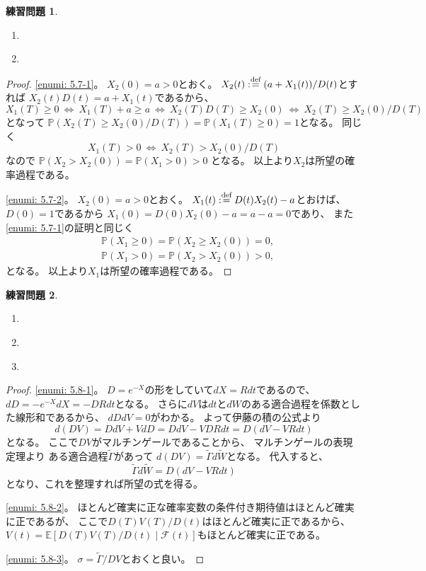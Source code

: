 \documentclass[uplatex]{jsarticle}
\theoremstyle{definition}
\newtheorem{prob}[prob]{練習問題}
\def\P{\mathbb{P}}
\def\E{\mathbb{E}}
\def\mcF{\mathcal{F}}
\def\dfn{:\overset{\mbox{{\scriptsize def}}}{=}}
\begin{document}
\begin{prob}\label{prob: 5.7}
  \begin{enumerate}
    \item \label{enumi: 5.7-1}
    \item \label{enumi: 5.7-2}
  \end{enumerate}
\end{prob}

\begin{proof}
  \ref{enumi: 5.7-1}。
  \(X_2(0) = a > 0\)とおく。
  \(X_2(t) \dfn (a+X_1(t))/D(t)\)とすれば
  \(X_2(t)D(t) = a+X_1(t)\)であるから、
  \[
  X_1(T) \geq 0 \ \iff \ X_1(T)+a \geq a \ \iff \ X_2(T)D(T) \geq X_2(0)
  \ \iff \ X_2(T) \geq X_2(0)/D(T)
  \]
  となって
  \(\P(X_2(T) \geq X_2(0) / D(T)) = \P(X_1(T) \geq 0) = 1\)となる。
  同じく
  \[
  X_1(T) > 0 \ \iff \ X_2(T) > X_2(0)/D(T)
  \]
  なので
  \(\P(X_2 > X_2(0)) = \P(X_1 > 0) > 0\)
  となる。
  以上より\(X_2\)は所望の確率過程である。

  \ref{enumi: 5.7-2}。
  \(X_2(0) = a > 0\)とおく。
  \(X_1(t) \dfn D(t)X_2(t) - a\)とおけば、
  \(D(0)=1\)であるから
  \(X_1(0) = D(0)X_2(0) - a = a-a = 0\)であり、
  また\ref{enumi: 5.7-1}の証明と同じく
  \begin{align*}
    &\P(X_1 \geq 0) = \P(X_2 \geq X_2(0)) = 0, \\
    &\P(X_1 > 0) = \P(X_2 > X_2(0)) > 0,
  \end{align*}
  となる。
  以上より\(X_1\)は所望の確率過程である。
\end{proof}






\begin{prob}\label{prob: 5.8}
  \begin{enumerate}
    \item \label{enumi: 5.8-1}
    \item \label{enumi: 5.8-2}
    \item \label{enumi: 5.8-3}
  \end{enumerate}
\end{prob}

\begin{proof}
  \ref{enumi: 5.8-1}。
  \(D=e^{-X}\)の形をしていて\(dX=Rdt\)であるので、
  \(dD = -e^{-X}dX = -DRdt\)となる。
  さらに\(dV\)は\(dt\)と\(dW\)のある適合過程を係数とした線形和であるから、
  \(dDdV = 0\)がわかる。
  よって伊藤の積の公式より
  \[
  d(DV) = DdV + VdD = DdV - VDRdt = D(dV-VRdt)
  \]
  となる。
  ここで\(DV\)がマルチンゲールであることから、
  マルチンゲールの表現定理より
  ある適合過程\(\tilde{\Gamma}\)があって
  \(d(DV) = \tilde{\Gamma}d\tilde{W}\)となる。
  代入すると、
  \[
  \tilde{\Gamma}d\tilde{W} = D(dV-VRdt)
  \]
  となり、これを整理すれば所望の式を得る。

  \ref{enumi: 5.8-2}。
  ほとんど確実に正な確率変数の条件付き期待値はほとんど確実に正であるが、
  ここで\(D(T)V(T)/D(t)\)はほとんど確実に正であるから、
  \(V(t) = \E [ D(T)V(T)/D(t) \mid \mcF(t)]\)もほとんど確実に正である。

  \ref{enumi: 5.8-3}。
  \(\sigma = \tilde{\Gamma}/DV\)とおくと良い。
\end{proof}
\end{document}

